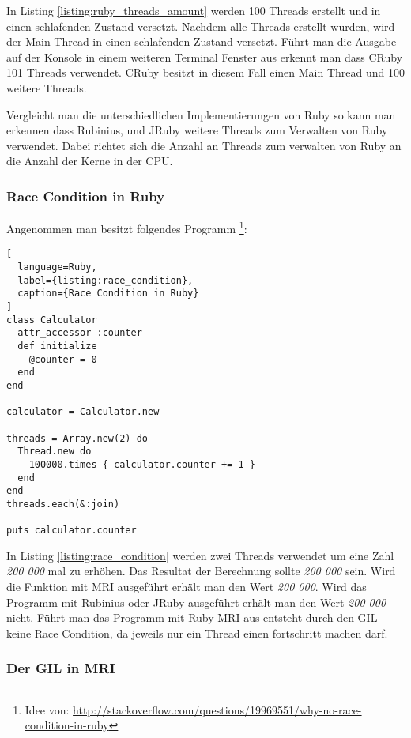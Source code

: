 In Listing \ref{listing:ruby_threads_amount} werden 100 Threads erstellt und in einen schlafenden Zustand versetzt. Nachdem alle Threads erstellt wurden, wird der Main Thread in einen schlafenden Zustand versetzt. Führt man die Ausgabe auf der Konsole in einem weiteren Terminal Fenster aus erkennt man dass CRuby 101 Threads verwendet. CRuby besitzt in diesem Fall einen Main Thread und 100 weitere Threads.

Vergleicht man die unterschiedlichen Implementierungen von Ruby so kann man erkennen dass Rubinius, und JRuby weitere Threads zum Verwalten von Ruby verwendet. Dabei richtet sich die Anzahl an Threads zum verwalten von Ruby an die Anzahl der Kerne in der CPU.

\subsubsection{Race Condition in Ruby}

Angenommen man besitzt folgendes Programm \footnote{Idee von: \url{http://stackoverflow.com/questions/19969551/why-no-race-condition-in-ruby}}: 

\begin{lstlisting}[
  language=Ruby,
  label={listing:race_condition},
  caption={Race Condition in Ruby}
]
class Calculator
  attr_accessor :counter
  def initialize
    @counter = 0
  end
end

calculator = Calculator.new

threads = Array.new(2) do
  Thread.new do
    100000.times { calculator.counter += 1 }
  end
end
threads.each(&:join)

puts calculator.counter

\end{lstlisting}

In Listing \ref{listing:race_condition} werden zwei Threads verwendet um eine Zahl \emph{200 000} mal zu erhöhen. Das Resultat der Berechnung sollte \emph{200 000} sein. Wird die Funktion mit MRI ausgeführt erhält man den Wert \emph{200 000}. Wird das Programm mit Rubinius oder JRuby ausgeführt erhält man den Wert \emph{200 000} nicht. Führt man das Programm mit Ruby MRI aus entsteht durch den GIL keine Race Condition, da jeweils nur ein Thread einen fortschritt machen darf.

\subsubsection{Der GIL in MRI}

